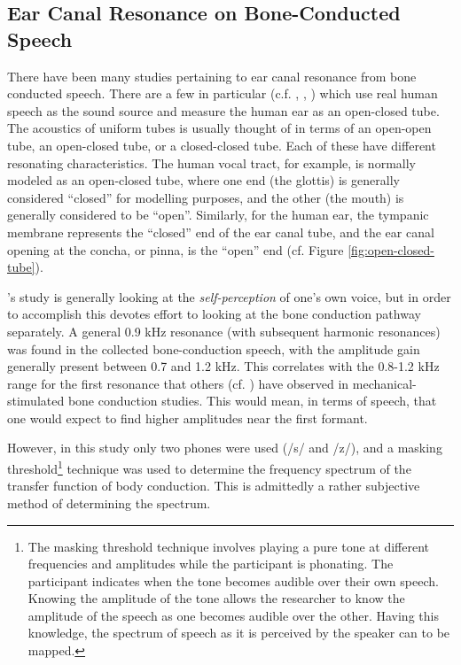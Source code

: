 \documentclass[dissertation,copyright]{uathesis}
\begin{document}
\subsection{Ear Canal Resonance on Bone-Conducted Speech}

There have been many studies pertaining to ear canal resonance from bone conducted speech.  There are a few in particular (c.f. \cite{bekesy:48}, \cite{porschmann:00}, \cite{reinfeldt:10}) which use real human speech as the sound source and measure the human ear as an open-closed tube.
%
The acoustics of uniform tubes is usually thought of in terms of an open-open tube, an open-closed tube, or a closed-closed tube.  Each of these have different resonating characteristics. The human vocal tract, for example, is normally modeled as an open-closed tube, where one end (the glottis) is generally considered ``closed'' for modelling purposes, and the other (the mouth) is generally considered to be ``open''.  Similarly, for the human ear, the tympanic membrane represents the ``closed'' end of the ear canal tube, and the ear canal opening at the concha, or pinna, is the ``open'' end (cf. Figure \ref{fig:open-closed-tube}).

\cite{porschmann:00}'s study is generally looking at the \textit{self-perception} of one's own voice, but in order to accomplish this devotes effort to looking at the bone conduction pathway separately.  A general 0.9 kHz resonance (with subsequent harmonic resonances) was found in the collected bone-conduction speech, with the amplitude gain generally present between 0.7 and 1.2 kHz.  This correlates with the 0.8-1.2 kHz range for the first resonance that others  (cf. \cite{hakansson:94}) have observed in mechanical-stimulated bone conduction studies. This would mean, in terms of speech, that one would expect to find higher amplitudes near the first formant.

However, in this study only two phones were used (/s/ and /z/), and a masking threshold\footnote{The masking threshold technique involves playing a pure tone at different frequencies and amplitudes while the participant is phonating. The participant indicates when the tone becomes audible over their own speech. Knowing the amplitude of the tone allows the researcher to know the amplitude of the speech as one becomes audible over the other. Having this knowledge, the spectrum of speech as it is perceived by the speaker can to be mapped.} technique was used to determine the frequency spectrum of the transfer function of body conduction.  This is admittedly a rather subjective method of determining the spectrum.  
\end{document}
